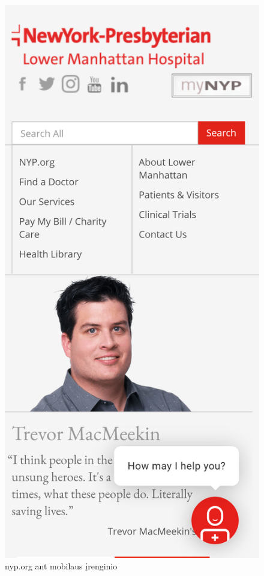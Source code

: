 \documentclass{VUMIFPSkursinis}
\begin{document}
\begin{figure}[H]
\begin{minipage}{.5\textwidth}
    \label{img:kaunomobile}
    \end{minipage}%
\begin{minipage}{.5\textwidth}
    \centering
    \includegraphics[scale=0.12]{img/NypMobile}
    \caption{nyp.org ant mobilaus įrenginio}
    \label{img:nypmobile}
    \end{minipage}
\end{figure}
\end{document}
